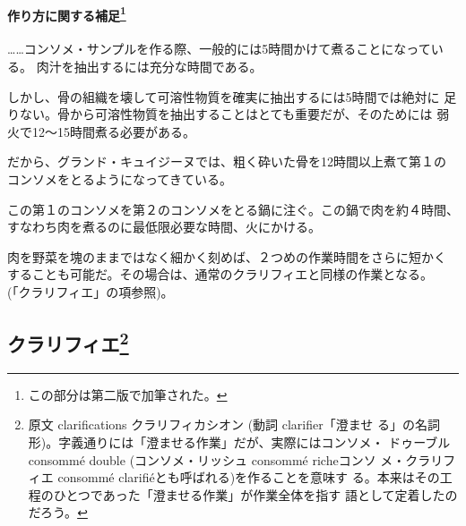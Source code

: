 \begin{recette}
{\paragraph[作り方に関する補足]{\texorpdfstring{作り方に関する補足\footnote{この部分は第二版で加筆された。}}{作り方に関する補足}}\label{ux4f5cux308aux65b9ux306bux95a2ux3059ux308bux88dcux8db33}}

\ldots{}\ldots{}コンソメ・サンプルを作る際、一般的には5時間かけて煮ることになっている。
肉汁を抽出するには充分な時間である。

しかし、骨の組織を壊して可溶性物質を確実に抽出するには5時間では絶対に
足りない。骨から可溶性物質を抽出することはとても重要だが、そのためには
弱火で12〜15時間煮る必要がある。

だから、グランド・キュイジーヌでは、粗く砕いた骨を12時間以上煮て第１の
コンソメをとるようになってきている。

この第１のコンソメを第２のコンソメをとる鍋に注ぐ。この鍋で肉を約４時間、
すなわち肉を煮るのに最低限必要な時間、火にかける。

肉を野菜を塊のままではなく細かく刻めば、２つめの作業時間をさらに短かく
することも可能だ。その場合は、通常のクラリフィエと同様の作業となる。
(「クラリフィエ」の項参照)。
\end{recette}
\hypertarget{ux30afux30e9ux30eaux30d5ux30a3ux30a84}{%
\subsection[クラリフィエ]{\texorpdfstring{クラリフィエ\footnote{原文
  clarifications クラリフィカシオン (動詞 clarifier「澄ませ
  る」の名詞形)。字義通りには「澄ませる作業」だが、実際にはコンソメ・
  ドゥーブルconsommé double (コンソメ・リッシュ consommé richeコンソ
  メ・クラリフィエ consommé clarifiéとも呼ばれる)を作ることを意味す
  る。本来はその工程のひとつであった「澄ませる作業」が作業全体を指す
  語として定着したのだろう。}}{クラリフィエ}}\label{ux30afux30e9ux30eaux30d5ux30a3ux30a84}}

